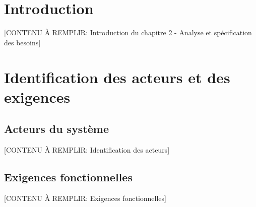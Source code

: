 \section*{Introduction}


[CONTENU À REMPLIR: Introduction du chapitre 2 - Analyse et spécification des besoins]

\section{Identification des acteurs et des exigences}


\subsection{Acteurs du système}

[CONTENU À REMPLIR: Identification des acteurs]


\subsection{Exigences fonctionnelles}


[CONTENU À REMPLIR: Exigences fonctionnelles]


